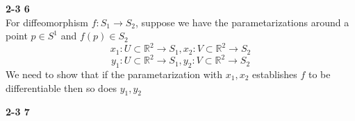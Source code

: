 \documentclass[12pt]{article}
\newenvironment{ques}[1]{\textbf{#1}\vspace{1 mm}\\ }{\bigskip}
\theoremstyle{definition}
\newcommand{\R}{\mathbb R}
\begin{document}
\begin{ques}{2-3 6}
	For diffeomorphism $f: S_1 \to S_2$, suppose we have the parametarizations
	around a point $p \in S^1$ and $f(p) \in S_2$
	$$x_1: U \subset \R^2 \to S_1, x_2: V \subset \R^2 \to S_2$$
	$$y_1: U \subset \R^2 \to S_1, y_2: V \subset \R^2 \to S_2$$
	We need to show that if the parametarization with $x_1, x_2$ establishes
	$f$ to be differentiable then so does $y_1, y_2$
\end{ques}

\begin{ques}{2-3 7}
\end{ques}
\end{document}
